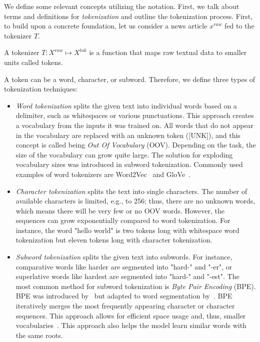 We define some relevant concepts utilizing the notation. First, we talk about terms and definitions for \emph{tokenization} and outline the tokenization process. First, to build upon a concrete foundation, let us consider a news article $x^{raw}$ fed to the tokenizer $T$.
\begin{definition}
    A tokenizer $T:X^{raw} \mapsto X^{tok}$ is a function that maps raw textual data to smaller units called tokens.
\end{definition}
A token can be a word, character, or subword. Therefore, we define three types of tokenization techniques:
\begin{itemize}
    \item \emph{Word tokenization} splits the given text into individual words based on a delimiter, such as whitespaces or various punctuations. This approach creates a vocabulary from the inputs it was trained on. All words that do not appear in the vocabulary are replaced with an unknown token ([UNK]), and this concept is called being \emph{Out Of Vocabulary} (OOV). Depending on the task, the size of the vocabulary can grow quite large. The solution for exploding vocabulary sizes was introduced in subword tokenization. Commonly used examples of word tokenizers are Word2Vec~\parencite{Word2Vec_Mikolov} and GloVe~\parencite{GloVe_Pennington}.
    \item \emph{Character tokenization} splits the text into single characters. The number of available characters is limited, e.g., to 256; thus, there are no unknown words, which means there will be very few or no OOV words. However, the sequences can grow exponentially compared to word tokenization. For instance, the word "hello world" is two tokens long with whitespace word tokenization but eleven tokens long with character tokenization.
    \item \emph{Subword tokenization} splits the given text into subwords. For instance, comparative words like harder are segmented into "hard-" and "-er", or superlative words like hardest are segmented into "hard-" and "-est". The most common method for subword tokenization is \emph{Byte Pair Encoding} (BPE). BPE was introduced by~\cite{ANewAlgorithmForDataCompression_Gage} but adapted to word segmentation by~\cite{NeuralMachineTranslationOfRareWords_Sennrich}. BPE iteratively merges the most frequently appearing character or character sequences. This approach allows for efficient space usage and, thus, smaller vocabularies~\parencite{NeuralMachineTranslationOfRareWords_Sennrich}. This approach also helps the model learn similar words with the same roots.
\end{itemize}
